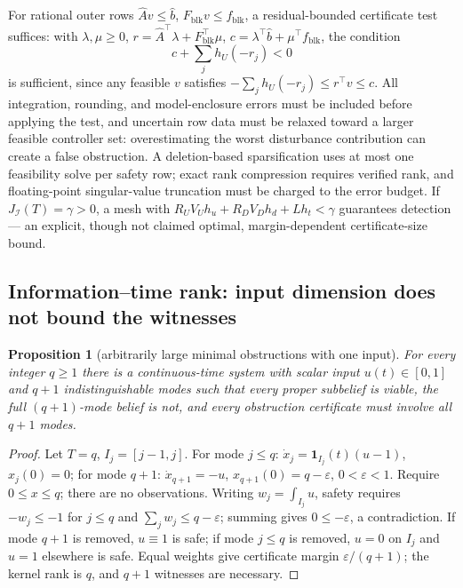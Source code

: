 \documentclass[10pt,twocolumn]{article}
\theoremstyle{plain}
\newtheorem{proposition}[theorem]{Proposition}
\theoremstyle{definition}
\theoremstyle{remark}
\begin{document}
For rational outer rows \(\widehat A v \le \widehat b\),
\(F_{\mathrm{blk}} v \le f_{\mathrm{blk}}\), a residual-bounded certificate
test suffices: with \(\lambda, \mu \ge 0\),
\(r = \widehat A^\top \lambda + F_{\mathrm{blk}}^\top \mu\),
\(c = \lambda^\top \widehat b + \mu^\top f_{\mathrm{blk}}\), the condition
\[
c + \sum_j h_U(-r_j) < 0
\tag{15}
\]
is sufficient, since any feasible \(v\) satisfies
\(-\sum_j h_U(-r_j) \le r^\top v \le c\). All integration, rounding, and
model-enclosure errors must be included before applying the test, and
uncertain row data must be relaxed toward a larger feasible controller set:
overestimating the worst disturbance contribution can create a false
obstruction. A deletion-based sparsification uses at most one feasibility
solve per safety row; exact rank compression requires verified rank, and
floating-point singular-value truncation must be charged to the error budget.
If \(J_{\mathcal{I}}(T) = \gamma > 0\), a mesh with
\(R_U V_U h_u + R_D V_D h_d + L h_t < \gamma\) guarantees detection --- an
explicit, though not claimed optimal, margin-dependent certificate-size
bound.

\subsection{Information--time rank: input dimension does not bound the witnesses}\label{rank}

\begin{proposition}[arbitrarily large minimal obstructions with one input]\label{prop:rank}
For every integer \(q \ge 1\) there is a continuous-time system with scalar
input \(u(t) \in [0,1]\) and \(q+1\) indistinguishable modes such that every
proper subbelief is viable, the full \((q{+}1)\)-mode belief is not, and
every obstruction certificate must involve all \(q+1\) modes.
\end{proposition}

\begin{proof}
Let \(T = q\), \(I_j = [j-1, j]\). For mode \(j \le q\):
\(\dot x_j = \mathbf{1}_{I_j}(t)(u - 1)\), \(x_j(0) = 0\); for mode \(q+1\):
\(\dot x_{q+1} = -u\), \(x_{q+1}(0) = q - \varepsilon\), \(0 < \varepsilon <
1\). Require \(0 \le x \le q\); there are no observations. Writing
\(w_j = \int_{I_j} u\), safety requires \(-w_j \le -1\) for \(j \le q\) and
\(\sum_j w_j \le q - \varepsilon\); summing gives \(0 \le -\varepsilon\), a
contradiction. If mode \(q+1\) is removed, \(u \equiv 1\) is safe; if mode
\(j \le q\) is removed, \(u = 0\) on \(I_j\) and \(u = 1\) elsewhere is
safe. Equal weights give certificate margin \(\varepsilon/(q+1)\); the
kernel rank is \(q\), and \(q+1\) witnesses are necessary.
\end{proof}
\end{document}
